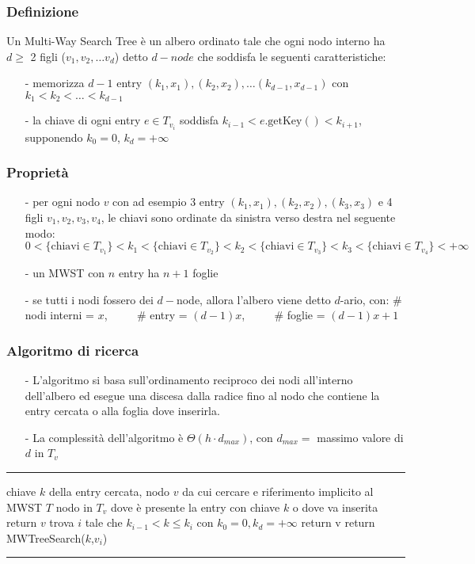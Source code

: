 \documentclass[a4paper]{article}
\makeatletter
\newenvironment{algo}[4]{
	\noindent\rule{\textwidth}{0.4pt}
	\begin{algorithmic}[1]
		\addtocounter{ALG@line}{-1}
		\Procedure{#1}{#2}
		\Require #3
		\Ensure #4
		\Statex }{
		\EndProcedure
	\end{algorithmic}
	\rule{\textwidth}{0.4pt}}
\makeatother
\begin{document}
\subsubsection*{Definizione}
Un  Multi-Way Search Tree è un albero ordinato tale che ogni nodo interno ha \(d \geq\) 2 figli (\(v_1, v_2, \dots v_d\)) detto
\(d-node\) che soddisfa le seguenti caratteristiche:
\begin{itemize}[topsep=3pt, itemsep=0pt]
	\item[-] memorizza \(d-1\) entry \((k_1,x_1), (k_2,x_2), \dots (k_{d-1}, x_{d-1})\) con \(k_1 < k_2 < \dots < k_{d-1}\)
	\item[-] la chiave di ogni entry \(e \in T_{v_i}\) soddisfa \(k_{i-1} < e.\text{getKey}() < k_{i+1}\), supponendo \(k_0 = 0\), \(k_d = +\infty\)
\end{itemize}

\subsubsection*{Proprietà}
\begin{itemize}[topsep=3pt, itemsep=0pt]
	\item[-] per ogni nodo \(v\) con ad esempio 3 entry \((k_1, x_1), (k_2, x_2), (k_3, x_3)\) e 4 figli \(v_1, v_2, v_3, v_4\),
	le chiavi sono ordinate da sinistra verso destra nel seguente modo:
	\subitem \(0 < \{\text{chiavi} \in T_{v_1}\} < k_1 < \{\text{chiavi} \in T_{v_2}\} < k_2 < \{\text{chiavi} \in T_{v_3}\} < k_3 < \{\text{chiavi} \in T_{v_4}\} < +\infty\)
	\item[-] un MWST con \(n\) entry ha \(n+1\) foglie
	\item[-] se tutti i nodi fossero dei \(d-\)node, allora l'albero viene detto \(d\)-ario, con:
	\subitem \# nodi interni = \(x\), \(\qquad\) \# entry = \((d-1)x\), \(\qquad\) \# foglie = \((d-1)x + 1\)
\end{itemize}

\subsubsection*{Algoritmo di ricerca}
\begin{itemize}[topsep=3pt, itemsep=0pt]
	\item[-] L'algoritmo si basa sull'ordinamento reciproco dei nodi all'interno dell'albero ed esegue una discesa dalla radice
	fino al nodo che contiene la entry cercata o alla foglia dove inserirla.
	\item[-] La complessità dell'algoritmo è \(\Theta(h \cdot d_{max})\), con \(d_{max} = \) massimo valore di \(d\) in \(T_v\)  
\end{itemize}
\begin{algo}{MWTreeSearch}{$k$, $v$}{chiave $k$ della entry cercata, nodo $v$ da cui cercare e riferimento implicito al MWST $T$}{nodo in $T_v$ dove è presente la entry con chiave $k$ o dove va inserita}
		\State return $v$
	\EndIf
	\State trova $i$ tale che $k_{i-1} < k \leq k_i$ con $k_0 = 0, k_d = +\infty$
		\State return v
	\Else
		\State return MWTreeSearch($k$,$v_i$)
	\EndIf
\end{algo}
\end{document}
